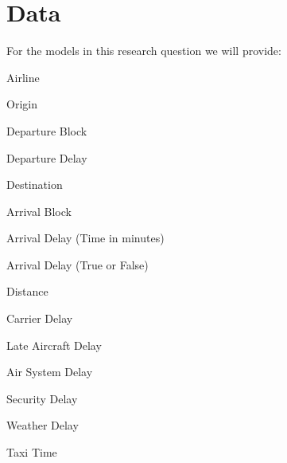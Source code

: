 \documentclass[a4paper,12pt]{article}
\begin{document}
\section{Data}
For the models in this research question we will provide:

Airline

Origin

Departure Block

Departure Delay

Destination

Arrival Block

Arrival Delay (Time in minutes)

Arrival Delay (True or False)

Distance 

Carrier Delay

Late Aircraft Delay

Air System Delay

Security Delay

Weather Delay

Taxi Time
\end{document}
